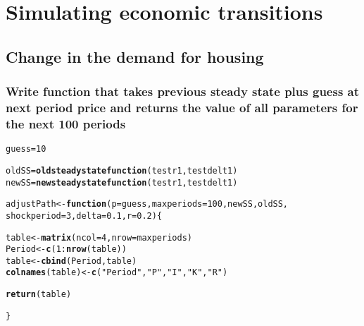 \documentclass{article}\usepackage[]{graphicx}\usepackage[]{color}
\makeatletter
\newcommand{\hlnum}[1]{\textcolor[rgb]{0.686,0.059,0.569}{#1}}%
\newcommand{\hlstr}[1]{\textcolor[rgb]{0.192,0.494,0.8}{#1}}%
\newcommand{\hlopt}[1]{\textcolor[rgb]{0,0,0}{#1}}%
\newcommand{\hlstd}[1]{\textcolor[rgb]{0.345,0.345,0.345}{#1}}%
\newcommand{\hlkwa}[1]{\textcolor[rgb]{0.161,0.373,0.58}{\textbf{#1}}}%
\newcommand{\hlkwb}[1]{\textcolor[rgb]{0.69,0.353,0.396}{#1}}%
\newcommand{\hlkwc}[1]{\textcolor[rgb]{0.333,0.667,0.333}{#1}}%
\newcommand{\hlkwd}[1]{\textcolor[rgb]{0.737,0.353,0.396}{\textbf{#1}}}%
\newenvironment{kframe}{%
 \def\at@end@of@kframe{}%
 \ifinner\ifhmode%
  \def\at@end@of@kframe{\end{minipage}}%
  \begin{minipage}{\columnwidth}%
 \fi\fi%
 \def\FrameCommand##1{\hskip\@totalleftmargin \hskip-\fboxsep
 \colorbox{shadecolor}{##1}\hskip-\fboxsep
     \hskip-\linewidth \hskip-\@totalleftmargin \hskip\columnwidth}%
 \MakeFramed {\advance\hsize-\width
   \@totalleftmargin\z@ \linewidth\hsize
   \@setminipage}}%
 {\par\unskip\endMakeFramed%
 \at@end@of@kframe}
\newenvironment{knitrout}{}{} %
\makeatother
\begin{document}
\section{Simulating economic transitions}
\subsection{Change in the demand for housing}
\subsubsection{Write function that takes previous steady state plus guess at next period price and returns the value of all parameters for the next 100 periods}

\begin{knitrout}
\color{fgcolor}\begin{kframe}
\begin{alltt}
\hlstd{guess} \hlkwb{=} \hlnum{10}

\hlstd{oldSS} \hlkwb{=} \hlkwd{oldsteadystatefunction}\hlstd{(testr1, testdelt1)}
\hlstd{newSS} \hlkwb{=} \hlkwd{newsteadystatefunction}\hlstd{(testr1, testdelt1)}

\hlstd{adjustPath} \hlkwb{<-} \hlkwa{function}\hlstd{(}\hlkwc{p} \hlstd{= guess,} \hlkwc{maxperiods} \hlstd{=} \hlnum{100}\hlstd{,} \hlkwc{newSS}\hlstd{,} \hlkwc{oldSS}\hlstd{,}
\hlkwc{shockperiod} \hlstd{=} \hlnum{3}\hlstd{,} \hlkwc{delta} \hlstd{=} \hlnum{0.1}\hlstd{,} \hlkwc{r} \hlstd{=} \hlnum{0.2}\hlstd{) \{}

  \hlstd{table} \hlkwb{<-} \hlkwd{matrix}\hlstd{(}\hlkwc{ncol} \hlstd{=} \hlnum{4}\hlstd{,} \hlkwc{nrow} \hlstd{= maxperiods)}
  \hlstd{Period} \hlkwb{<-} \hlkwd{c}\hlstd{(}\hlnum{1}\hlopt{:}\hlkwd{nrow}\hlstd{(table))}
  \hlstd{table} \hlkwb{<-} \hlkwd{cbind}\hlstd{(Period,table)}
  \hlkwd{colnames}\hlstd{(table)} \hlkwb{<-} \hlkwd{c}\hlstd{(}\hlstr{"Period"}\hlstd{,}\hlstr{"P"}\hlstd{,} \hlstr{"I"}\hlstd{,} \hlstr{"K"}\hlstd{,} \hlstr{"R"}\hlstd{)}

  \hlkwd{return}\hlstd{(table)}

\hlstd{\}}


\end{alltt}
\end{kframe}
\end{knitrout}
\end{document}
